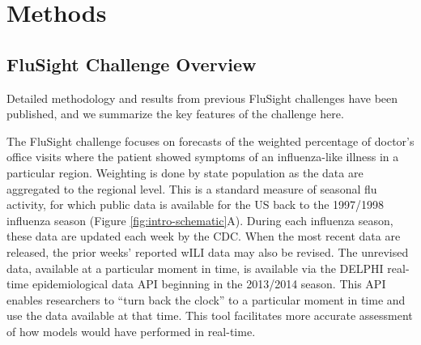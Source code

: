 \documentclass{article}
\begin{document}
\section{Methods}

\subsection{FluSight Challenge Overview}
 
Detailed methodology and results from previous FluSight challenges have been published\cite{Biggerstaff2016,Biggerstaff2018}, and we summarize the key features of the challenge here.

The FluSight challenge focuses on forecasts of the weighted percentage of doctor's office visits where the patient showed symptoms of an influenza-like illness in a particular region. Weighting is done by state population as the data are aggregated to the regional level.
This is a standard measure of seasonal flu activity, for which public data is available for the US back to the 1997/1998 influenza season (Figure \ref{fig:intro-schematic}A). 
During each influenza season, these data are updated each week by the CDC. When the most recent data are released, the prior weeks' reported wILI data may also be revised. 
The unrevised data, available at a particular moment in time, is available via the DELPHI real-time epidemiological data API beginning in the 2013/2014 season.\cite{DELPHI} 
This API enables researchers to ``turn back the clock'' to a particular moment in time and use the data available at that time. This tool facilitates more accurate assessment of how models would have performed in real-time. 
\end{document}
